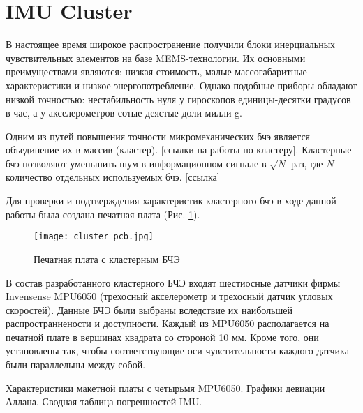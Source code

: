 \section {IMU Cluster}
В настоящее время широкое распространение получили блоки инерциальных чувствительных элементов на базе MEMS-технологии.
Их основными преимуществами являются: низкая стоимость, малые массогабаритные характеристики и низкое энергопотребление.
Однако подобные приборы обладают низкой точностью: нестабильность нуля у гироскопов единицы-десятки градусов в час, а у акселерометров сотые-деястые доли милли-g.

Одним из путей повышения точности микромеханических бчэ является объединение их в массив (кластер). [ссылки на работы по кластеру].
Кластерные бчэ позволяют уменьшить шум в информационном сигнале в $\sqrt{N}$ раз, где $N$ - количество отдельных используемых бчэ. [ссылка]

\newpage

Для проверки и подтверждения характеристик кластерного бчэ в ходе данной работы была создана печатная плата (Рис. \ref{fig:cluster_pcb}).

\begin{figure}[h!]
	\centering
	\texttt{[image: cluster\_pcb.jpg]}
	\caption{Печатная плата с кластерным БЧЭ}
	\label{fig:cluster_pcb}
\end{figure}

В состав разработанного кластерного БЧЭ входят шестиосные датчики фирмы Invensense MPU6050 (трехосный акселерометр и трехосный датчик угловых скоростей).
Данные БЧЭ были выбраны вследствие их наибольшей распространнености и доступности.
Каждый из MPU6050 располагается на печатной плате в вершинах квадрата со стороной 10 мм.
Кроме того, они установлены так, чтобы соответствующие оси чувстительности каждого датчика были параллельны между собой.

Характеристики макетной платы с четырьмя MPU6050. Графики девиации Аллана. Сводная таблица погрешностей IMU.